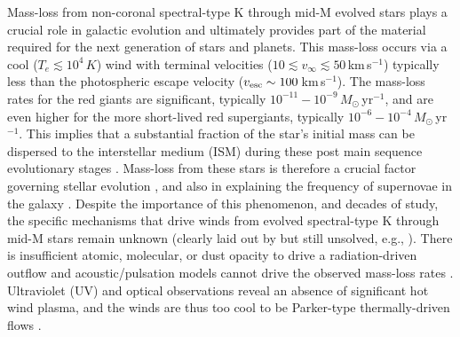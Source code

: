 Mass-loss from non-coronal spectral-type K through mid-M evolved stars plays a crucial role in galactic evolution and ultimately provides part of the material required for the next generation of stars and planets. This mass-loss occurs via a cool ($T_{e} \lesssim 10^4\,K$) wind with terminal velocities ($10 \lesssim v_{\infty} \lesssim 50$\,km\,s$^{-1}$) typically less than the photospheric escape velocity ($v_{\rm{esc}} \sim 100$\,km\,s$^{-1}$). The mass-loss rates for the red giants are significant, typically $10^{-11}-10^{-9}$\,$M_{\odot}$\,yr$^{-1}$, and are even higher for the more short-lived red supergiants, typically $10^{-6}-10^{-4}$\,$M_{\odot}$\,yr$^{-1}$. This implies that a substantial fraction of the star's initial mass can be dispersed to the interstellar medium (ISM) during these post main sequence evolutionary stages \citep[e.g.,][]{schroder_2001}. Mass-loss from these stars is therefore a crucial factor governing stellar evolution \citep{chiosi_1986}, and also in explaining the frequency of supernovae in the galaxy \citep{van_loon_2010,dohm-palmer_2002}. Despite the importance of this phenomenon, and decades of study, the specific mechanisms that drive winds from evolved spectral-type K through mid-M stars remain unknown (clearly laid out by \citealt{holzer_1985} but still unsolved, e.g., \citealt{crowley_2009}). There is insufficient atomic, molecular, or dust opacity to drive a radiation-driven outflow \citep{zukerman_1995,jones_2008} and acoustic/pulsation models cannot drive the observed mass-loss rates \citep{sutmann_1995}. Ultraviolet (UV) and optical observations reveal an absence of significant hot wind plasma, and the winds are thus too cool to be Parker-type thermally-driven flows \cite[e.g.,][]{linsky_1979,haisch_1980,ayres_1981}. 

